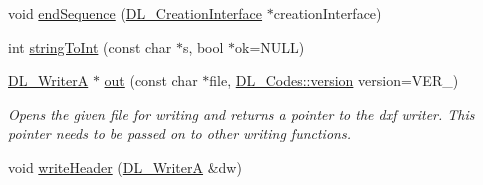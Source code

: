 \begin{DoxyCompactItemize}
\item 
void \hyperlink{classDL__Jww_a64b01766fcbddeeb15f3dd25c4d904c1}{end\-Sequence} (\hyperlink{classDL__CreationInterface}{D\-L\-\_\-\-Creation\-Interface} $\ast$creation\-Interface)
\item 
int \hyperlink{classDL__Jww_a7261b1a7090ab37ac757dfe47c490100}{string\-To\-Int} (const char $\ast$s, bool $\ast$ok=N\-U\-L\-L)
\item 
\hyperlink{classDL__WriterA}{D\-L\-\_\-\-Writer\-A} $\ast$ \hyperlink{classDL__Jww_aad15221b60ada330f8ec03a6060465da}{out} (const char $\ast$file, \hyperlink{classDL__Codes_a5eba107e2d280c70b52ffab0292fb9dc}{D\-L\-\_\-\-Codes\-::version} version=V\-E\-R\-\_)
\begin{DoxyCompactList}\small\item\em Opens the given file for writing and returns a pointer to the dxf writer. This pointer needs to be passed on to other writing functions. \end{DoxyCompactList}\item 
\hypertarget{classDL__Jww_a2eb885ef30754f3db11026487b70ea43}{void \hyperlink{classDL__Jww_a2eb885ef30754f3db11026487b70ea43}{write\-Header} (\hyperlink{classDL__WriterA}{D\-L\-\_\-\-Writer\-A} \&dw)}\label{classDL__Jww_a2eb885ef30754f3db11026487b70ea43}


\end{DoxyCompactItemize}
